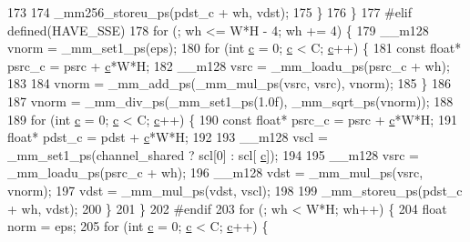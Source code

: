 \begin{DoxyCode}
173 
174                         \_mm256\_storeu\_ps(pdst\_c + wh, vdst);
175                     \}
176                 \}
177 \textcolor{preprocessor}{#elif defined(HAVE\_SSE)}
178                 \textcolor{keywordflow}{for} (; wh <= W*H - 4; wh += 4) \{
179                     \_\_m128 vnorm = \_mm\_set1\_ps(eps);
180                     \textcolor{keywordflow}{for} (\textcolor{keywordtype}{int} \hyperlink{CMakeCache_8txt_aac1d6a1710812201527c735f7c6afbaa}{c} = 0; \hyperlink{CMakeCache_8txt_aac1d6a1710812201527c735f7c6afbaa}{c} < C; \hyperlink{CMakeCache_8txt_aac1d6a1710812201527c735f7c6afbaa}{c}++) \{
181                         \textcolor{keyword}{const} \textcolor{keywordtype}{float}* psrc\_c = psrc + \hyperlink{CMakeCache_8txt_aac1d6a1710812201527c735f7c6afbaa}{c}*W*H;
182                         \_\_m128 vsrc = \_mm\_loadu\_ps(psrc\_c + wh);
183 
184                         vnorm = \_mm\_add\_ps(\_mm\_mul\_ps(vsrc, vsrc), vnorm);
185                     \}
186 
187                     vnorm = \_mm\_div\_ps(\_mm\_set1\_ps(1.0f), \_mm\_sqrt\_ps(vnorm));
188 
189                     \textcolor{keywordflow}{for} (\textcolor{keywordtype}{int} \hyperlink{CMakeCache_8txt_aac1d6a1710812201527c735f7c6afbaa}{c} = 0; \hyperlink{CMakeCache_8txt_aac1d6a1710812201527c735f7c6afbaa}{c} < C; \hyperlink{CMakeCache_8txt_aac1d6a1710812201527c735f7c6afbaa}{c}++) \{
190                         \textcolor{keyword}{const} \textcolor{keywordtype}{float}* psrc\_c = psrc + \hyperlink{CMakeCache_8txt_aac1d6a1710812201527c735f7c6afbaa}{c}*W*H;
191                               \textcolor{keywordtype}{float}* pdst\_c = pdst + \hyperlink{CMakeCache_8txt_aac1d6a1710812201527c735f7c6afbaa}{c}*W*H;
192 
193                         \_\_m128 vscl = \_mm\_set1\_ps(channel\_shared ? scl[0] : scl[
      \hyperlink{CMakeCache_8txt_aac1d6a1710812201527c735f7c6afbaa}{c}]);
194 
195                         \_\_m128 vsrc = \_mm\_loadu\_ps(psrc\_c + wh);
196                         \_\_m128 vdst = \_mm\_mul\_ps(vsrc, vnorm);
197                         vdst = \_mm\_mul\_ps(vdst, vscl);
198 
199                         \_mm\_storeu\_ps(pdst\_c + wh, vdst);
200                     \}
201                 \}
202 \textcolor{preprocessor}{#endif}
203                 \textcolor{keywordflow}{for} (; wh < W*H; wh++) \{
204                     \textcolor{keywordtype}{float} norm = eps;
205                     \textcolor{keywordflow}{for} (\textcolor{keywordtype}{int} \hyperlink{CMakeCache_8txt_aac1d6a1710812201527c735f7c6afbaa}{c} = 0; \hyperlink{CMakeCache_8txt_aac1d6a1710812201527c735f7c6afbaa}{c} < C; \hyperlink{CMakeCache_8txt_aac1d6a1710812201527c735f7c6afbaa}{c}++) \{

\end{DoxyCode}
